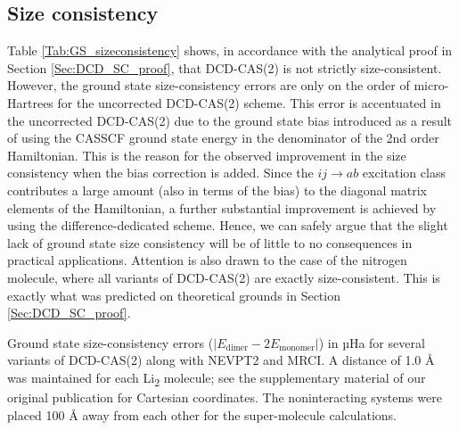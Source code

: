 \subsection{Size consistency} 
Table \ref{Tab:GS_sizeconsistency} shows, in accordance with the analytical proof in Section \ref{Sec:DCD_SC_proof}, that DCD-CAS(2) is not strictly size-consistent. However, the ground state size-consistency errors are only on the order of micro-Hartrees for the uncorrected DCD-CAS(2) scheme. This error is accentuated in the uncorrected DCD-CAS(2) due to the ground state bias introduced as a result of using the CASSCF ground state energy in the denominator of the 2nd order Hamiltonian. This is the reason for the observed improvement in the size consistency when the bias correction is added. Since the $ij\rightarrow ab$ excitation class contributes a large amount (also in terms of the bias) to the diagonal matrix elements of the Hamiltonian, a further substantial improvement is achieved by using the difference-dedicated scheme. Hence, we can safely argue that the slight lack of ground state size consistency will be of little to no consequences in practical applications.\cite{RinteAVG_2005_44105} Attention is also drawn to the case of the nitrogen molecule, where all variants of DCD-CAS(2) are exactly size-consistent. This is exactly what was predicted on theoretical grounds in Section \ref{Sec:DCD_SC_proof}. 
\begin{table}
\small
\centering
\ttabbox
{\caption[Ground state size-consistency errors for several variants of DCD-CAS(2) along with NEVPT2 and MRCI.]{Ground state size-consistency errors ($|E_\text{dimer} - 2E_\text{monomer}|$) in µHa for several variants of DCD-CAS(2) along with NEVPT2 and MRCI. A distance of 1.0 Å was maintained for each Li\textsubscript{2} molecule; see the supplementary material of our original publication for Cartesian coordinates.\cite{PathaLN_2017_234109} The noninteracting systems were placed 100 Å away from each other for the super-molecule calculations.}
\label{Tab:GS_sizeconsistency}}
{}
\end{table}

